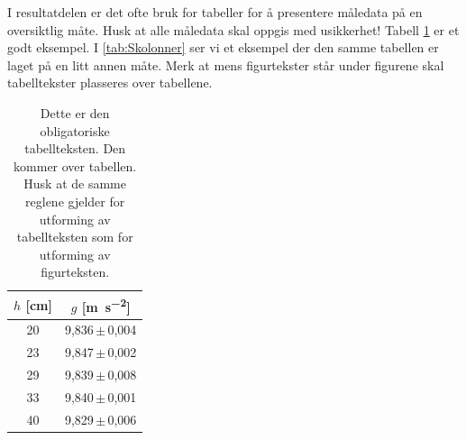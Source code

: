 I resultatdelen er det ofte bruk for tabeller for å presentere måledata på en oversiktlig måte. Husk at alle måledata skal oppgis med usikkerhet! Tabell \ref{tab:ckolonner} er et godt eksempel. 
I \autoref{tab:Skolonner} ser vi et eksempel der den samme tabellen er laget på en litt annen måte. Merk at mens figurtekster står under figurene skal tabelltekster plasseres over tabellene.

\begin{table}[tbp]
\centering %
\caption{Dette er den obligatoriske tabellteksten. Den kommer over tabellen. Husk at de samme reglene gjelder for utforming av tabellteksten som for utforming av figurteksten.}
\label{tab:ckolonner}	%
\begin{tabular}{cc} %
\toprule %
$h$ [\si{\centi\metre}] & $g$ [\si{\metre\per\second\squared}] \\ %
\midrule
20  & 9,836\,$\pm$\,0,004 \\ %
23  & 9,847\,$\pm$\,0,002 \\
29  & 9,839\,$\pm$\,0,008 \\
33  & 9,840\,$\pm$\,0,001 \\
40  & 9,829\,$\pm$\,0,006 \\
\bottomrule
\end{tabular}
\end{table}


